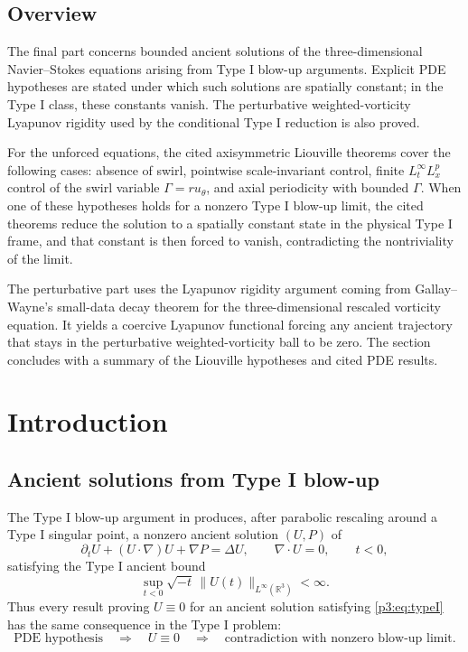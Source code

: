\documentclass[11pt]{amsart}
\theoremstyle{plain}
\theoremstyle{definition}
\theoremstyle{remark}
\numberwithin{equation}{section}
\begin{document}
\subsection*{Overview}

The final part concerns bounded ancient solutions of the three-dimensional
Navier--Stokes equations arising from Type I blow-up arguments.  Explicit PDE
hypotheses are stated under which such solutions are spatially constant; in the
Type I class, these constants vanish.  The perturbative weighted-vorticity
Lyapunov rigidity used by the conditional Type I reduction is also proved.

For the unforced equations, the cited axisymmetric Liouville theorems cover the
following cases: absence of swirl, pointwise scale-invariant control, finite
\(L_t^\infty L_x^p\) control of the swirl variable \(\Gamma=ru_\theta\), and
axial periodicity with bounded \(\Gamma\).  When one of these hypotheses holds
for a nonzero Type I blow-up limit, the cited theorems reduce the solution to a
spatially constant state in the physical Type I frame, and that constant is
then forced to vanish, contradicting the nontriviality of the limit.

The perturbative part uses the Lyapunov rigidity argument coming from Gallay--Wayne's
small-data decay theorem for the three-dimensional rescaled vorticity equation.
It yields a coercive Lyapunov functional forcing any ancient trajectory that
stays in the perturbative weighted-vorticity ball to be zero.  The section
concludes with a summary of the Liouville hypotheses and cited PDE results.

\section{Introduction}

\subsection{Ancient solutions from Type I blow-up}

The Type I blow-up argument in  produces, after
parabolic rescaling around a Type I singular point, a nonzero ancient solution
\((U,P)\) of
\begin{equation}\label{p3:eq:NS}
   \partial_tU+(U\cdot\nabla)U+\nabla P=\Delta U,
   \qquad \nabla\cdot U=0,
   \qquad t<0,
\end{equation}
satisfying the Type I ancient bound
\begin{equation}\label{p3:eq:typeI}
   \sup_{t<0}\sqrt{-t}\,
   \|U(t)\|_{L^\infty(\mathbb R^3)}<\infty .
\end{equation}
Thus every result proving \(U\equiv0\) for an ancient solution satisfying
\eqref{p3:eq:typeI} has the same consequence in the Type I problem:
\[
   \text{PDE hypothesis}
   \quad\Longrightarrow\quad
   U\equiv0
   \quad\Longrightarrow\quad
   \text{contradiction with nonzero blow-up limit}.
\]
\end{document}
